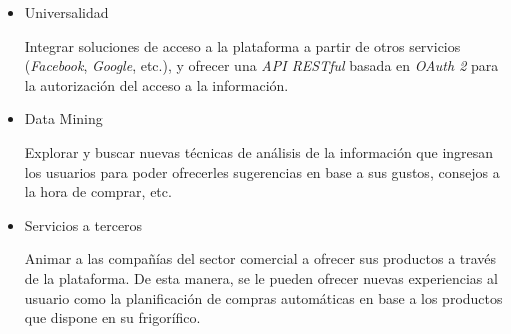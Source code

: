 \begin{itemize}

    \item Universalidad

        Integrar soluciones de acceso a la plataforma a partir de otros servicios (\emph{Facebook}, \emph{Google}, etc.), y ofrecer una \emph{API RESTful} basada en \emph{OAuth 2} para la autorización del acceso a la información.

    \item Data Mining

        Explorar y buscar nuevas técnicas de análisis de la información que ingresan los usuarios para poder ofrecerles sugerencias en base a sus gustos, consejos a la hora de comprar, etc.

    \item Servicios a terceros

        Animar a las compañías del sector comercial a ofrecer sus productos a través de la plataforma. De esta manera, se le pueden ofrecer nuevas experiencias al usuario como la planificación de compras automáticas en base a los productos que dispone en su frigorífico.
    \end{itemize}